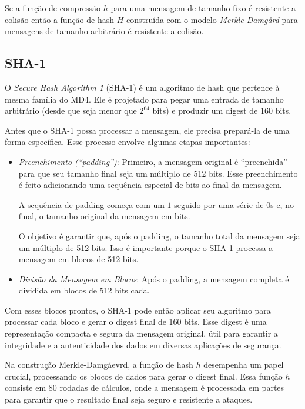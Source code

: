 \begin{theorem}
  Se a função de compressão $h$ para uma mensagem de tamanho fixo é resistente a colisão então a função de hash $H$ construída com o modelo {\em Merkle-Damg\aa rd} para mensagens de tamanho arbitrário é resistente a colisão.
\end{theorem}

\subsection{SHA-1}
\label{sec:sha-1}

O {\em Secure Hash Algorithm 1} (SHA-1) é um algoritmo de hash que pertence à mesma família do MD4.
Ele é projetado para pegar uma entrada de tamanho arbitrário (desde que seja menor que $2^{64}$ bits) e produzir um digest de 160 bits.

Antes que o SHA-1 possa processar a mensagem, ele precisa prepará-la de uma forma específica. Esse processo envolve algumas etapas importantes:

\begin{itemize}
\item[] {\em Preenchimento (``padding'')}:
  Primeiro, a mensagem original é ``preenchida'' para que seu tamanho final seja um múltiplo de 512 bits.
  Esse preenchimento é feito adicionando uma sequência especial de bits ao final da mensagem.

  A sequência de padding começa com um $1$ seguido por uma série de $0$s e, no final, o tamanho original da mensagem em bits.

  O objetivo é garantir que, após o padding, o tamanho total da mensagem seja um múltiplo de 512 bits.
  Isso é importante porque o SHA-1 processa a mensagem em blocos de 512 bits.
\item {\em Divisão da Mensagem em Blocos}:
  Após o padding, a mensagem completa é dividida em blocos de 512 bits cada.
\end{itemize}

Com esses blocos prontos, o SHA-1 pode então aplicar seu algoritmo para processar cada bloco e gerar o digest final de 160 bits.
Esse digest é uma representação compacta e segura da mensagem original, útil para garantir a integridade e a autenticidade dos dados em diversas aplicações de segurança.

Na construção Merkle-Damg\aa evrd, a função de hash $h$ desempenha um papel crucial, processando os blocos de dados para gerar o digest final.
Essa função $h$ consiste em 80 rodadas de cálculos, onde a mensagem é processada em partes para garantir que o resultado final seja seguro e resistente a ataques.

